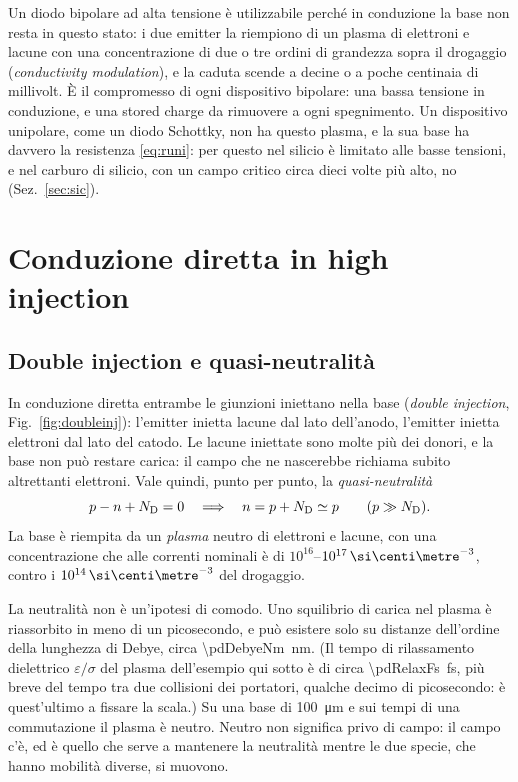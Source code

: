 \documentclass[10pt,a4paper]{scrartcl}
\let\newcommand\pdvaluedefine
\newcommand{\ND}{N_\mathrm{D}}
\newcommand{\Pp}{p\textsuperscript{+}}
\newcommand{\Np}{n\textsuperscript{+}}
\newcommand{\cmc}{\si{\centi\metre^{-3}}}
\begin{document}
Un diodo bipolare ad alta tensione è utilizzabile perché in conduzione la base non resta in questo stato: i due emitter la riempiono di un plasma di elettroni e lacune con una concentrazione di due o tre ordini di grandezza sopra il drogaggio (\emph{conductivity modulation}), e la caduta scende a decine o a poche centinaia di millivolt. È il compromesso di ogni dispositivo bipolare: una bassa tensione in conduzione, e una stored charge da rimuovere a ogni spegnimento. Un dispositivo unipolare, come un diodo Schottky, non ha questo plasma, e la sua base ha davvero la resistenza \eqref{eq:runi}: per questo nel silicio è limitato alle basse tensioni, e nel carburo di silicio, con un campo critico circa dieci volte più alto, no (Sez.~\ref{sec:sic}).
\section{Conduzione diretta in high injection}
\label{sec:conduction}
\subsection{Double injection e quasi-neutralità}
\label{sec:doubleinj}
In conduzione diretta entrambe le giunzioni iniettano nella base (\emph{double injection}, Fig.~\ref{fig:doubleinj}): l'emitter \Pp{} inietta lacune dal lato dell'anodo, l'emitter \Np{} inietta elettroni dal lato del catodo. Le lacune iniettate sono molte più dei donori, e la base non può restare carica: il campo che ne nascerebbe richiama subito altrettanti elettroni. Vale quindi, punto per punto, la \emph{quasi-neutralità}
\begin{equation}
p - n + \ND = 0 \quad\Longrightarrow\quad n = p + \ND \simeq p \qquad (p \gg \ND) .
\label{eq:neutrality}
\end{equation}
La base è riempita da un \emph{plasma} neutro di elettroni e lacune, con una concentrazione che alle correnti nominali è di $10^{16}$--$10^{17}\,\cmc$, contro i $10^{14}\,\cmc$ del drogaggio.

La neutralità non è un'ipotesi di comodo. Uno squilibrio di carica nel plasma è riassorbito in meno di un picosecondo, e può esistere solo su distanze dell'ordine della lunghezza di Debye, circa \SI{\pdDebyeNm}{\nano\metre}. (Il tempo di rilassamento dielettrico $\varepsilon/\sigma$ del plasma dell'esempio qui sotto è di circa \SI{\pdRelaxFs}{\femto\second}, più breve del tempo tra due collisioni dei portatori, qualche decimo di picosecondo: è quest'ultimo a fissare la scala.) Su una base di \SI{100}{\micro\metre} e sui tempi di una commutazione il plasma è neutro. Neutro non significa privo di campo: il campo c'è, ed è quello che serve a mantenere la neutralità mentre le due specie, che hanno mobilità diverse, si muovono.
\end{document}
